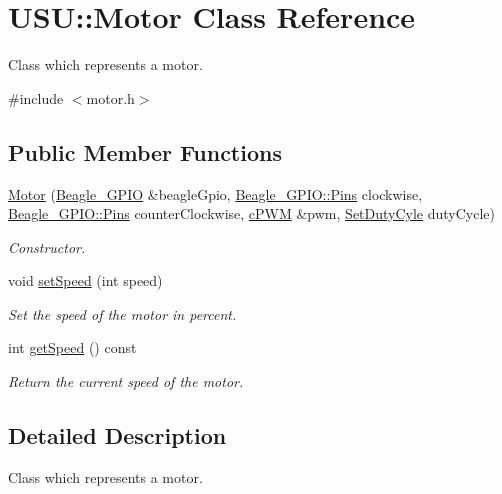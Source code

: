 \hypertarget{class_u_s_u_1_1_motor}{\section{\-U\-S\-U\-:\-:\-Motor \-Class \-Reference}
\label{class_u_s_u_1_1_motor}
}


\-Class which represents a motor.  




{\ttfamily \#include $<$motor.\-h$>$}

\subsection*{\-Public \-Member \-Functions}
\begin{DoxyCompactItemize}
\item 
\hyperlink{class_u_s_u_1_1_motor_a2200a3939cd62d2e22e9b134b54bc402}{\-Motor} (\hyperlink{class_beagle___g_p_i_o}{\-Beagle\-\_\-\-G\-P\-I\-O} \&beagle\-Gpio, \hyperlink{class_beagle___g_p_i_o_a9b1fd560ea5d2d65898ac15c23055e58}{\-Beagle\-\_\-\-G\-P\-I\-O\-::\-Pins} clockwise, \hyperlink{class_beagle___g_p_i_o_a9b1fd560ea5d2d65898ac15c23055e58}{\-Beagle\-\_\-\-G\-P\-I\-O\-::\-Pins} counter\-Clockwise, \hyperlink{classc_p_w_m}{c\-P\-W\-M} \&pwm, \hyperlink{motor_8h_aa4a2cd53d0866ae4c273573db3c4870d}{\-Set\-Duty\-Cyle} duty\-Cycle)
\begin{DoxyCompactList}\small\item\em \-Constructor. \end{DoxyCompactList}\item 
void \hyperlink{class_u_s_u_1_1_motor_aa58cbc26a0da87389dd208367d0fa407}{set\-Speed} (int speed)
\begin{DoxyCompactList}\small\item\em \-Set the speed of the motor in percent. \end{DoxyCompactList}\item 
int \hyperlink{class_u_s_u_1_1_motor_a98d4c98ddc30e00485712f55b4a91211}{get\-Speed} () const 
\begin{DoxyCompactList}\small\item\em \-Return the current speed of the motor. \end{DoxyCompactList}\end{DoxyCompactItemize}


\subsection{\-Detailed \-Description}
\-Class which represents a motor. 

